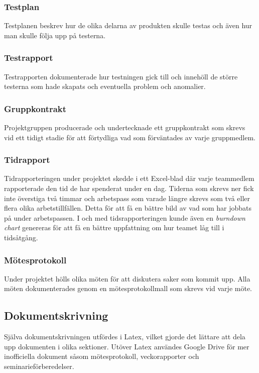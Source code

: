 \subsubsection*{Testplan}
Testplanen beskrev hur de olika delarna av produkten skulle testas och även hur man skulle följa upp på testerna.

\subsubsection*{Testrapport}
Testrapporten dokumenterade hur testningen gick till och innehöll de större testerna som hade skapats och eventuella problem och anomalier.

\subsubsection*{Gruppkontrakt}
Projektgruppen producerade och undertecknade ett gruppkontrakt som skrevs vid ett tidigt stadie för att förtydliga vad som förväntades av varje gruppmedlem.

\subsubsection*{Tidrapport}
Tidrapporteringen under projektet skedde i ett Excel-blad där varje teammedlem rapporterade den tid de har spenderat under en dag. Tiderna som skrevs ner fick inte överstiga två timmar och arbetspass som varade längre skrevs som två eller flera olika arbetstillfällen. Detta för att få en bättre bild av vad som har jobbats på under arbetspassen. I och med tidsrapporteringen kunde även en \textit{burndown chart} genereras för att få en bättre uppfattning om hur teamet låg till i tidsåtgång.

\subsubsection*{Mötesprotokoll}
Under projektet hölls olika möten för att diskutera saker som kommit upp. Alla möten dokumenterades genom en mötesprotokollmall som skrevs vid varje möte.

\subsection{Dokumentskrivning}
Själva dokumentskrivningen utfördes i Latex, vilket gjorde det lättare att dela upp dokumenten i olika sektioner. Utöver Latex användes Google Drive för mer inofficiella dokument såsom mötesprotokoll, veckorapporter och seminarieförberedelser.

